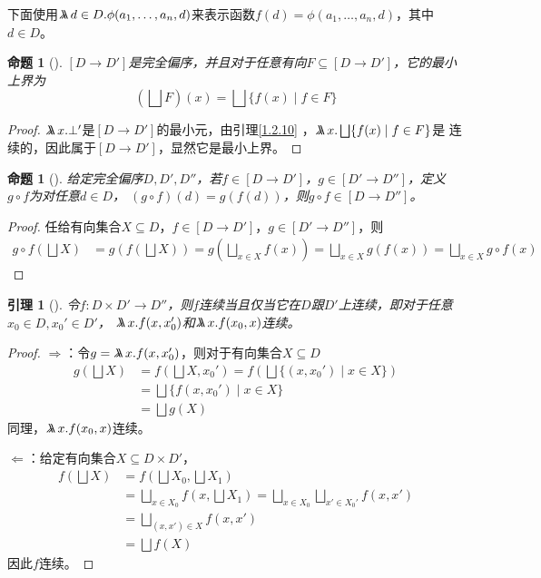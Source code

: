 \documentclass[11pt]{article}
\newtheorem{proposition}[theorem]{命题}
\newtheorem{lemma}[theorem]{引理}
\begin{document}
下面使用\(\metalambda d\in D.\phi(a_1,\dots,a_n,d)\)来表示函数\(f(d)=\phi(a_1,\dots,a_n,d)\)，其中\(d\in D\)。

\begin{proposition}[]
\label{1.2.11}
\([D\to D']\)是完全偏序，并且对于任意有向\(F\subseteq[D\to D']\)，它的最小上界为
\begin{equation*}
(\bigsqcup F)(x)=\bigsqcup\{f(x)\mid f\in F\}
\end{equation*}
\end{proposition}

\begin{proof}
\(\metalambda x.\bot'\)是\([D\to D']\)的最小元，由引理\ref{1.2.10} ，\(\metalambda x.\bigsqcup\{f(x)\mid f\in F\}\)是
连续的，因此属于\([D\to D']\)，显然它是最小上界。
\end{proof}

\begin{proposition}[]
给定完全偏序\(D,D',D''\)，若\(f\in[D\to D']\)，\(g\in[D'\to D'']\)，定义\(g\circ f\)为对任意\(d\in D\)，
\((g\circ f)(d)=g(f(d))\)，则\(g\circ f\in[D\to D'']\)。
\end{proposition}

\begin{proof}
任给有向集合\(X\subseteq D\)，\(f\in[D\to D']\)，\(g\in[D'\to D'']\)，则
\begin{align*}
g\circ f(\bigsqcup X)&=g(f(\bigsqcup X))=g(\bigsqcup_{x\in X} f(x))=\bigsqcup_{x\in X}g(f(x))=\bigsqcup_{x\in X} g\circ f(x)
\end{align*}
\end{proof}


\begin{lemma}[]
\label{1.2.12}
令\(f:D\times D'\to D''\)，则\(f\)连续当且仅当它在\(D\)跟\(D'\)上连续，即对于任意\(x_0\in D,x_0'\in D'\)，
\(\metalambda x.f(x,x_0')\)和\(\metalambda x.f(x_0,x)\)连续。
\end{lemma}

\begin{proof}
\(\Rightarrow\)：令\(g=\metalambda x.f(x,x_0')\)，则对于有向集合\(X\subseteq D\)
\begin{align*}
g(\bigsqcup X)&=f(\bigsqcup X,x_0')=f(\bigsqcup\{(x,x_0')\mid x\in X\})\\
&=\bigsqcup\{f(x,x_0')\mid x\in X\}\\
&=\bigsqcup g(X)
\end{align*}
同理，\(\metalambda x.f(x_0,x)\)连续。

\(\Leftarrow\)：给定有向集合\(X\subseteq D\times D'\)，
\begin{align*}
f(\bigsqcup X)&=f(\bigsqcup X_0,\bigsqcup X_1)\\
&=\bigsqcup_{x\in X_0}f(x,\bigsqcup X_1)=\bigsqcup_{x\in X_0}\bigsqcup_{x'\in X_0'}f(x,x')\\
&=\bigsqcup_{(x,x')\in X}f(x,x')\\
&=\bigsqcup f(X)
\end{align*}
因此\(f\)连续。
\end{proof}
\end{document}
